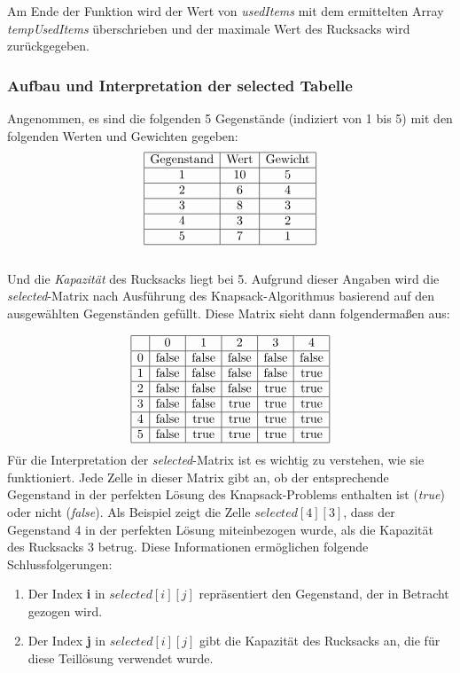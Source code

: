 Am Ende der Funktion wird der Wert von \textit{usedItems} mit dem ermittelten Array \textit{tempUsedItems} überschrieben
und der maximale Wert des Rucksacks wird zurückgegeben.
\subsubsection*{Aufbau und Interpretation der selected Tabelle}
Angenommen, es sind die folgenden  5 Gegenstände (indiziert von 1 bis 5) mit den folgenden Werten und Gewichten gegeben:
\[
\begin{array}{|c|c|c|}
\hline
\text{Gegenstand} & \text{Wert} & \text{Gewicht} \\
\hline
1 & 10 & 5 \\
\hline
2 & 6 & 4 \\
\hline
3 & 8 & 3 \\
\hline
4 & 3 & 2 \\
\hline
5 & 7 & 1 \\
\hline
\end{array}
\]
\\
Und die \textit{Kapazität} des Rucksacks liegt bei 5. Aufgrund dieser Angaben wird die \textit{selected}-Matrix nach
Ausführung des Knapsack-Algorithmus basierend auf den ausgewählten Gegenständen gefüllt. Diese Matrix sieht dann folgendermaßen
aus:

\[
\begin{array}{|c|c|c|c|c|c|}
\hline
& 0 & 1 & 2 & 3 & 4 \\
\hline
0 & \text{false} & \text{false} & \text{false} & \text{false} & \text{false} \\
\hline
1 & \text{false} & \text{false} & \text{false} & \text{false} & \text{true} \\
\hline
2 & \text{false} & \text{false} & \text{false} & \text{true} & \text{true} \\
\hline
3 & \text{false} & \text{false} & \text{true} & \text{true} & \text{true} \\
\hline
4 & \text{false} & \text{true} & \text{true} & \text{true} & \text{true} \\
\hline
5 & \text{false} & \text{true} & \text{true} & \text{true} & \text{true} \\
\hline
\end{array}
\]
Für die Interpretation der \textit{selected}-Matrix ist es wichtig zu verstehen, wie sie funktioniert. Jede Zelle in dieser
Matrix gibt an, ob der entsprechende Gegenstand in der perfekten Lösung des Knapsack-Problems enthalten ist (\textit{true})
oder nicht (\textit{false}). Als Beispiel zeigt die Zelle $selected[4][3]$, dass der Gegenstand 4 in der perfekten Lösung
miteinbezogen wurde, als die Kapazität des Rucksacks 3 betrug. Diese Informationen ermöglichen folgende Schlussfolgerungen:
\begin{enumerate}
    \item Der Index \textbf{i} in $selected[i][j]$ repräsentiert den Gegenstand, der in Betracht gezogen wird.
    \item Der Index \textbf{j} in $selected[i][j]$ gibt die Kapazität des Rucksacks an, die für diese Teillösung verwendet
    wurde.
\end{enumerate}

